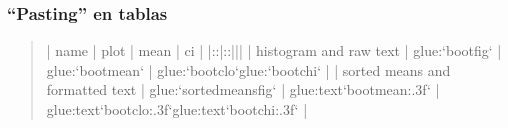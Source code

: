 \documentclass[letterpaper,10pt,english]{jupyterBook}
\begin{document}
\subsubsection{“Pasting” en tablas}
\label{\detokenize{docs/01_01_Code_Blocks:pasting-en-tablas}}\begin{quote}

\begin{sphinxVerbatim}[commandchars=\\\{\}]
| name                            |       plot                    | mean                      | ci                                                |
|:\PYGZhy{}\PYGZhy{}\PYGZhy{}\PYGZhy{}\PYGZhy{}\PYGZhy{}\PYGZhy{}\PYGZhy{}\PYGZhy{}\PYGZhy{}\PYGZhy{}\PYGZhy{}\PYGZhy{}\PYGZhy{}\PYGZhy{}\PYGZhy{}\PYGZhy{}\PYGZhy{}\PYGZhy{}\PYGZhy{}\PYGZhy{}\PYGZhy{}\PYGZhy{}\PYGZhy{}\PYGZhy{}\PYGZhy{}\PYGZhy{}\PYGZhy{}\PYGZhy{}\PYGZhy{}\PYGZhy{}:|:\PYGZhy{}\PYGZhy{}\PYGZhy{}\PYGZhy{}\PYGZhy{}\PYGZhy{}\PYGZhy{}\PYGZhy{}\PYGZhy{}\PYGZhy{}\PYGZhy{}\PYGZhy{}\PYGZhy{}\PYGZhy{}\PYGZhy{}\PYGZhy{}\PYGZhy{}\PYGZhy{}\PYGZhy{}\PYGZhy{}\PYGZhy{}\PYGZhy{}\PYGZhy{}\PYGZhy{}\PYGZhy{}\PYGZhy{}\PYGZhy{}\PYGZhy{}\PYGZhy{}:|\PYGZhy{}\PYGZhy{}\PYGZhy{}\PYGZhy{}\PYGZhy{}\PYGZhy{}\PYGZhy{}\PYGZhy{}\PYGZhy{}\PYGZhy{}\PYGZhy{}\PYGZhy{}\PYGZhy{}\PYGZhy{}\PYGZhy{}\PYGZhy{}\PYGZhy{}\PYGZhy{}\PYGZhy{}\PYGZhy{}\PYGZhy{}\PYGZhy{}\PYGZhy{}\PYGZhy{}\PYGZhy{}\PYGZhy{}\PYGZhy{}|\PYGZhy{}\PYGZhy{}\PYGZhy{}\PYGZhy{}\PYGZhy{}\PYGZhy{}\PYGZhy{}\PYGZhy{}\PYGZhy{}\PYGZhy{}\PYGZhy{}\PYGZhy{}\PYGZhy{}\PYGZhy{}\PYGZhy{}\PYGZhy{}\PYGZhy{}\PYGZhy{}\PYGZhy{}\PYGZhy{}\PYGZhy{}\PYGZhy{}\PYGZhy{}\PYGZhy{}\PYGZhy{}\PYGZhy{}\PYGZhy{}\PYGZhy{}\PYGZhy{}\PYGZhy{}\PYGZhy{}\PYGZhy{}\PYGZhy{}\PYGZhy{}\PYGZhy{}\PYGZhy{}\PYGZhy{}\PYGZhy{}\PYGZhy{}\PYGZhy{}\PYGZhy{}\PYGZhy{}\PYGZhy{}\PYGZhy{}\PYGZhy{}\PYGZhy{}\PYGZhy{}\PYGZhy{}\PYGZhy{}\PYGZhy{}\PYGZhy{}|
| histogram and raw text          | \PYGZob{}glue:\PYGZcb{}`boot\PYGZus{}fig`             | \PYGZob{}glue:\PYGZcb{}`boot\PYGZus{}mean`          | \PYGZob{}glue:\PYGZcb{}`boot\PYGZus{}clo`\PYGZhy{}\PYGZob{}glue:\PYGZcb{}`boot\PYGZus{}chi`                   |
| sorted means and formatted text | \PYGZob{}glue:\PYGZcb{}`sorted\PYGZus{}means\PYGZus{}fig`     | \PYGZob{}glue:text\PYGZcb{}`boot\PYGZus{}mean:.3f` | \PYGZob{}glue:text\PYGZcb{}`boot\PYGZus{}clo:.3f`\PYGZhy{}\PYGZob{}glue:text\PYGZcb{}`boot\PYGZus{}chi:.3f` |
\end{sphinxVerbatim}



\end{quote}
\end{document}
